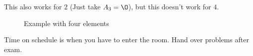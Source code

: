 \begin{remark}
    This also works for $2$ (Just take $A_3 = \O$), but this doesn't work for $4$.
\end{remark}
\begin{figure}[H]
    \centering
    \caption{Example with four elements}
    \label{fig:example-with-four-elements}
\end{figure}
\begin{remark}
    Time on schedule is when you have to enter the room.
    Hand over problems after exam.
\end{remark}
